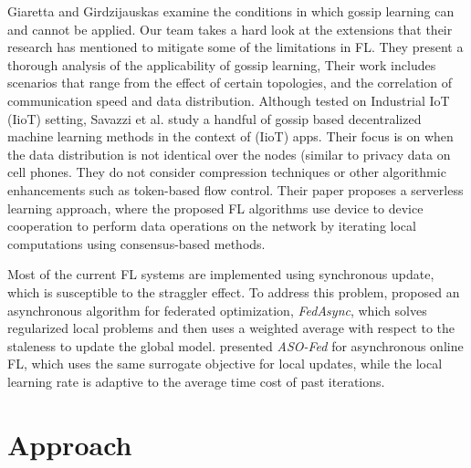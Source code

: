 \documentclass[10pt,twocolumn,letterpaper]{article}
\theoremstyle{definition}
\begin{document}
Giaretta and Girdzijauskas \cite{giaretta2019gossip}  examine the conditions in which gossip learning can and cannot be applied.  Our team takes a hard look at the extensions that their research has mentioned to mitigate some of the limitations in FL.  They present a thorough analysis of the applicability of gossip learning, Their work includes scenarios that range from the effect of certain topologies, and the correlation of communication speed and data distribution. %
Although tested on Industrial IoT (IioT) setting, Savazzi et al. \cite{savazzi2020federated} study a handful of gossip based decentralized machine learning methods in the context of (IioT) apps. Their focus is on when the data distribution is not identical over the nodes (similar to privacy data on cell phones. They do not consider compression techniques or other algorithmic enhancements such as token-based flow control.
Their paper proposes a serverless learning approach, where the proposed FL algorithms use device to device cooperation to perform data operations on the  network by iterating local computations using consensus-based methods. %

Most of the current FL systems are implemented using synchronous update, which is susceptible to the straggler effect. To address this problem, \cite{xie2019asynchronous} proposed an asynchronous algorithm for federated optimization, \textit{FedAsync}, which solves regularized local problems and then uses a weighted average with respect to the staleness to update the global model. \cite{chen2019asynchronous} presented \textit{ASO-Fed} for asynchronous online FL, which uses the same surrogate objective for local updates, while the local learning rate is adaptive to the average time cost of past iterations. 

\section{Approach}

\end{document}
